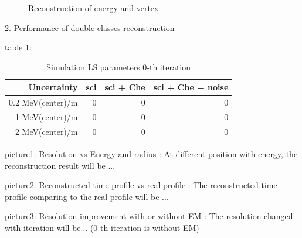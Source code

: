 \documentclass{article}
\begin{document}
\begin{figure}[htbp]
%
%
\centering
\caption{ Reconstruction of energy and vertex}
\label{fig:4}
\end{figure}

\par 2. Performance of double classes reconstruction
\par table 1:
	\begin{table}[htbp]
		\centering
		\caption{Simulation LS parameters 0-th iteration}
		\label{tab:4}	
		\begin{tabular}{|r|*{3}{r|}}
		\hline
		Uncertainty & sci & sci + Che & sci + Che + noise\\
		\hline
		0.2 MeV(center)/m & 0 & 0 & 0 \\
		1 MeV(center)/m & 0 & 0 & 0 \\
		2 MeV(center)/m & 0 & 0 & 0 \\
		\hline
		\end{tabular}
	\end{table}
	
\par picture1: Resolution vs Energy and radius : At different position with energy, the reconstruction result will be ...
\par picture2: Reconstructed time profile vs real profile : The reconstructed time profile comparing to the real profile will be ...
\par picture3: Resolution improvement with or without EM : The resolution changed with iteration will be... (0-th iteration is without EM)
\end{document}

